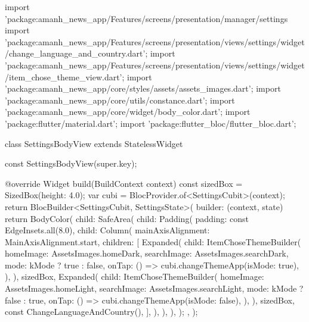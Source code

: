 import 'package:amanh_news_app/Features/screens/presentation/manager/settings%
import 'package:amanh_news_app/Features/screens/presentation/views/settings/widget/change_language_and_country.dart';
import 'package:amanh_news_app/Features/screens/presentation/views/settings/widget/item_chose_theme_view.dart';
import 'package:amanh_news_app/core/styles/assets/assets_images.dart';
import 'package:amanh_news_app/core/utils/constance.dart';
import 'package:amanh_news_app/core/widget/body_color.dart';
import 'package:flutter/material.dart';
import 'package:flutter_bloc/flutter_bloc.dart';

class SettingsBodyView extends StatelessWidget {
  const SettingsBodyView({super.key});

  @override
  Widget build(BuildContext context) {
    const sizedBox = SizedBox(height: 4.0);
    var cubi = BlocProvider.of<SettingsCubit>(context);
    return BlocBuilder<SettingsCubit, SettingsState>(
      builder: (context, state) {
        return BodyColor(
          child: SafeArea(
            child: Padding(
              padding: const EdgeInsets.all(8.0),
              child: Column(
                mainAxisAlignment: MainAxisAlignment.start,
                children: [
                  Expanded(
                    child: ItemChoseThemeBuilder(
                      homeImage: AssetsImages.homeDark,
                      searchImage: AssetsImages.searchDark,
                      mode: kMode ? true : false,
                      onTap: () => cubi.changeThemeApp(isMode: true),
                    ),
                  ),
                  sizedBox,
                  Expanded(
                    child: ItemChoseThemeBuilder(
                      homeImage: AssetsImages.homeLight,
                      searchImage: AssetsImages.searchLight,
                      mode: kMode ? false : true,
                      onTap: () => cubi.changeThemeApp(isMode: false),
                    ),
                  ),
                  sizedBox,
                  const ChangeLanguageAndCountry(),
                ],
              ),
            ),
          ),
        );
      },
    );
  }
}

